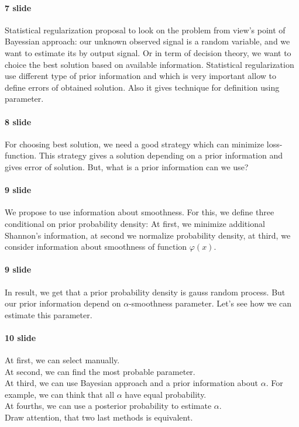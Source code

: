 \documentclass[a4paper]{article}
\begin{document}
\paragraph{7 slide}
Statistical regularization proposal to look on the problem from view's point of Bayessian approach: our unknown observed signal is  a random variable, and we want to estimate its by output signal. Or in term of decision theory, we want  to choice the best solution based on available information.
Statistical regularization use different type of prior information and which is very important allow to define errors of obtained solution. Also it gives technique for definition using parameter. 

\paragraph{8 slide}
For choosing best solution, we need a good strategy which can minimize loss-function. This strategy gives a solution depending on a prior information and gives error of solution. But, what is a prior information can we use? 
\paragraph{9 slide}
We propose to use information about smoothness. For this, we define three conditional on prior probability density:
At first, we minimize additional Shannon's information, at second we normalize probability density, at third, we consider information about smoothness of function $\varphi(x)$.
\paragraph{9 slide}
In result, we get that a prior probability density is gauss random process. But our prior information depend on $\alpha$-smoothness parameter. Let's see how we can estimate this parameter.
\paragraph{10 slide}
At first, we can select manually.\\
At second, we can find the most probable parameter.\\
At third, we can use Bayesian approach and a prior information about $\alpha$. For example, we can think that all $\alpha$ have equal probability.\\
At fourths, we can use a posterior probability to estimate $\alpha$.\\
Draw attention, that two last methods is equivalent.
\end{document}
